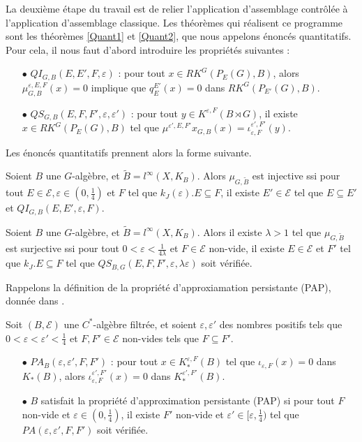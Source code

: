 La deuxième étape du travail est de relier l'application d'assemblage contrôlée à l'application d'assemblage classique. Les théorèmes qui réalisent ce programme sont les théorèmes \ref{Quant1} et \ref{Quant2}, que nous appelons énoncés quantitatifs. Pour cela, il nous faut d'abord introduire les propriétés suivantes :
\begin{itemize}
\item[$\bullet$] $QI_{G,B}(E,E',F,\varepsilon)$ : pour tout $x\in RK^G(P_E(G), B )$, alors $\mu^{\varepsilon,E,F}_{G,B}(x) = 0$ implique que $q_E^{E'}(x)=0$ dans $RK^G(P_{E'}(G),B)$.
\item[$\bullet$] $QS_{G,B}(E,F,F',\varepsilon,\varepsilon')$ : pour tout $y\in K^{\varepsilon,F}(B\rtimes G)$, il existe $x\in RK^G(P_E(G),B)$ tel que $\mu^{\varepsilon',E,F'}x_{G,B}(x)=\iota_{\varepsilon,F}^{\varepsilon',F'}(y)$.\\
\end{itemize} 

Les énoncés quantitatifs prennent alors la forme suivante.

\begin{thm}
Soient $B$ une $G$-algèbre, et $\tilde B = l^\infty(X,K_B)$. Alors $\mu_{G,\tilde B}$ est injective ssi pour tout $E\in\mathcal E,\varepsilon\in(0,\frac{1}{4})$ et $F$ tel que $k_J(\varepsilon).E\subseteq F$, il existe $E' \in\mathcal E$ tel que $E\subseteq E'$ et $QI_{G,B}(E,E',\varepsilon,F)$. 
\end{thm}

\begin{thm}
Soient $B$ une $G$-algèbre, et $\tilde B = l^\infty(X,K_B)$. Alors il existe $\lambda>1$ tel que $\mu_{G,\tilde B}$ est surjective ssi pour tout $0<\varepsilon<\frac{1}{4\lambda}$ et $F\in\mathcal E$ non-vide, il existe $E\in\mathcal E$ et $F'$ tel que $k_J .E \subseteq F$ tel que $QS_{B,G}(E,F,F',\varepsilon,\lambda\varepsilon)$ soit vérifiée.
\end{thm}

Rappelons la définition de la propriété d'approxiamation persistante (PAP), donnée dans \cite{OY3}.

\begin{definition}
Soit $(B,\mathcal E)$ une $C^*$-algèbre filtrée, et soient $\varepsilon,\varepsilon'$ des nombres positifs tels que $0<\varepsilon <\varepsilon' <\frac{1}{4}$ et $F,F'\in\mathcal E$ non-vides tels que $F\subseteq F'$. 
\begin{itemize}
\item[$\bullet$] $PA_B(\varepsilon,\varepsilon',F,F')$ : pour tout $x\in K_*^{\varepsilon,F}(B)$ tel que $\iota_{\varepsilon,F}(x)=0$ dans $K_*(B)$, alors $\iota_{\varepsilon,F}^{\varepsilon',F'}(x)=0$ dans $K_*^{\varepsilon',F'}(B)$.
\item[$\bullet$] $B$ satisfait la propriété d'approximation persistante (PAP) si pour tout $F$ non-vide et $\varepsilon\in (0,\frac{1}{4})$, il existe $F'$ non-vide et $\varepsilon'\in [\varepsilon,\frac{1}{4})$ tel que $PA(\varepsilon,\varepsilon',F,F')$ soit vérifiée.
\end{itemize}
\end{definition}

